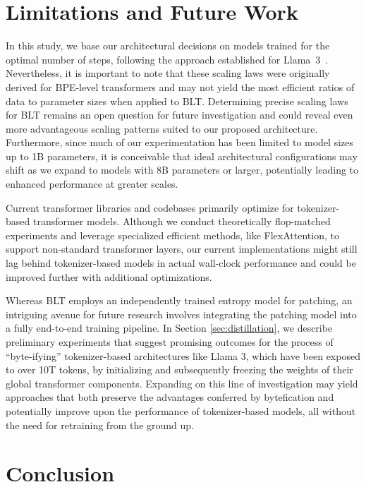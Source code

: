 \section{Limitations and Future Work}

In this study, we base our architectural decisions on models trained for the optimal number of steps, following the approach established for Llama~3~\citep{dubey2024llama}. Nevertheless, it is important to note that these scaling laws were originally derived for BPE-level transformers and may not yield the most efficient ratios of data to parameter sizes when applied to {\textsc BLT}. Determining precise scaling laws for {\textsc BLT} remains an open question for future investigation and could reveal even more advantageous scaling patterns suited to our proposed architecture. Furthermore, since much of our experimentation has been limited to model sizes up to 1B parameters, it is conceivable that ideal architectural configurations may shift as we expand to models with 8B parameters or larger, potentially leading to enhanced performance at greater scales.

Current transformer libraries and codebases primarily optimize for tokenizer-based transformer models. Although we conduct theoretically flop-matched experiments and leverage specialized efficient methods, like FlexAttention, to support non-standard transformer layers, our current implementations might still lag behind tokenizer-based models in actual wall-clock performance and could be improved further with additional optimizations.

Whereas {\textsc BLT} employs an independently trained entropy model for patching, an intriguing avenue for future research involves integrating the patching model into a fully end-to-end training pipeline. In Section \ref{sec:distillation}, we describe preliminary experiments that suggest promising outcomes for the process of ``byte-ifying'' tokenizer-based architectures like Llama 3, which have been exposed to over 10T tokens, by initializing and subsequently freezing the weights of their global transformer components. Expanding on this line of investigation may yield approaches that both preserve the advantages conferred by bytefication and potentially improve upon the performance of tokenizer-based models, all without the need for retraining from the ground up.

\section{Conclusion}
\label{section:conclusion}

